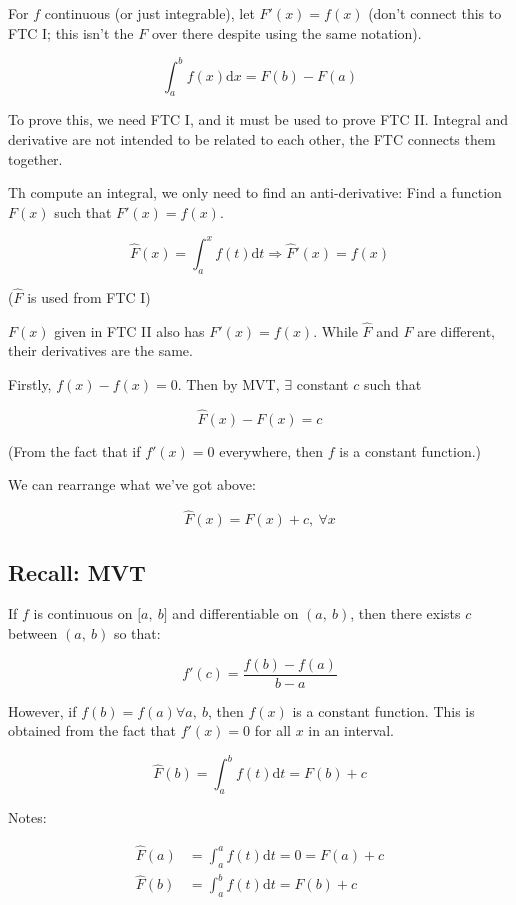 \documentclass[12pt]{article}
\theoremstyle{plain}
\theoremstyle{remark}
\theoremstyle{definition}
\begin{document}
For \(f\) continuous (or just integrable), let \(F'(x) = f(x)\)
(don't connect this to FTC I; this isn't the \(F\) over there despite
using the same notation).

\[\int_{a}^{b}{f(x)\text{d}x} = F(b) - F(a)\]

To prove this, we need FTC I, and it must be used to prove FTC II.
Integral and derivative are not intended to be related to each other,
the FTC connects them together.

Th compute an integral, we only need to find an anti-derivative: Find a
function \(F(x)\) such that \(F'(x) = f(x)\).

\[\widehat{F}(x) = \int_{a}^{x}{f(t)\text{d}t} \Rightarrow {\widehat{F}}'(x) = f(x)\]

(\(\widehat{F}\) is used from FTC I)

\(F(x)\) given in FTC II also has \(F'(x) = f(x)\). While
\(\widehat{F}\) and \(F\) are different, their derivatives are the same.

Firstly, \(f(x) - f(x) = 0\). Then by MVT, \(\exists\) constant \(c\)
such that

\[\widehat{F}(x) - F(x) = c\]

(From the fact that if \(f'(x) = 0\) everywhere, then \(f\) is a
constant function.)

We can rearrange what we've got above:

\[\widehat{F}(x) = F(x) + c,\ \forall x\]


\subsection{Recall: MVT}

If \(f\) is continuous on \(\lbrack a,\ b\rbrack\) and differentiable on
\((a,\ b)\), then there exists \(c\) between \((a,\ b)\) so that:

\[f'(c) = \frac{f(b) - f(a)}{b - a}\]

However, if \(f(b) = f(a)\forall a,\ b\), then \(f(x)\) is a constant
function. This is obtained from the fact that \(f'(x) = 0\) for all
\(x\) in an interval.

\[\widehat{F}(b) = \int_{a}^{b}{f(t)\text{d}t} = F(b) + c\]

Notes:

\begin{align*}
\widehat{F}(a) &= \int_{a}^{a}{f(t)\text{d}t} = 0 = F(a) + c \\
\widehat{F}(b) &= \int_{a}^{b}{f(t)\text{d}t} = F(b) + c
\end{align*}
\end{document}
